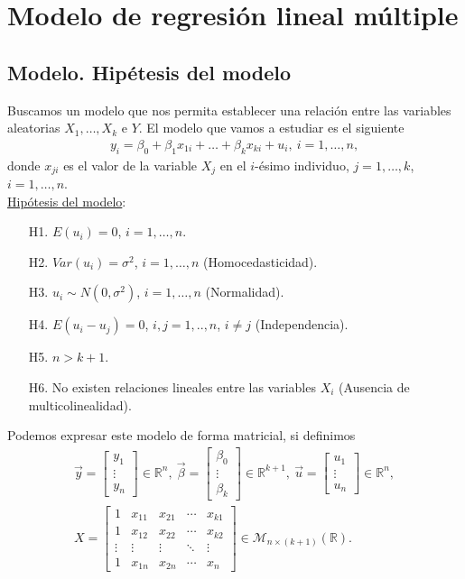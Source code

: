 \chapter{Modelo de regresión lineal múltiple}

\section{Modelo. Hipétesis del modelo}
\noindent Buscamos un modelo que nos permita establecer una relación entre las variables aleatorias $X_1,\ldots,X_k$ e $Y$. El modelo que vamos a estudiar es el siguiente
\begin{align*}
    y_i = \beta_0 + \beta_1 x_{1i} + \ldots + \beta_k x_{ki} + u_i, \ i = 1,\ldots,n,
\end{align*}
donde $x_{ji}$ es el valor de la variable $X_j$ en el $i$-ésimo individuo, $j = 1,\ldots,k$, $i=1,\ldots,n$.
\\
\newline
\underline{Hipótesis del modelo}:
\begin{enumerate}
    \item[H1.] $E(u_i) = 0$, $i = 1,\ldots,n$.
    \item[H2.] $Var(u_i) = \sigma^2$, $i = 1,\ldots,n$ (Homocedasticidad).
    \item[H3.] $u_i \sim N(0,\sigma^2)$, $i = 1,\ldots,n$ (Normalidad).
    \item[H4.] $E(u_i - u_j) = 0$, $i,j=1,..,n$, $i \not = j$ (Independencia).
    \item[H5.] $n > k+1$.
    \item[H6.] No existen relaciones lineales entre las variables $X_i$ (Ausencia de multicolinealidad).
\end{enumerate}
Podemos expresar este modelo de forma matricial, si definimos
\begin{align*}
    \vec{y} = \begin{bmatrix}
    y_1 \\
    \vdots \\
    y_n
    \end{bmatrix} \in \mathbb{R}^n, \ \vec{\beta} = \begin{bmatrix}
    \beta_0 \\
    \vdots \\
    \beta_k 
    \end{bmatrix} \in \mathbb{R}^{k+1}, \ \vec{u} = \begin{bmatrix}
    u_1 \\
    \vdots \\
    u_n 
    \end{bmatrix} \in \mathbb{R}^n, \\
    X = \begin{bmatrix}
    1 & x_{11} & x_{21} & \cdots & x_{k1} \\
    1 & x_{12} & x_{22} & \cdots & x_{k2} \\
    \vdots & \vdots & \vdots & \ddots & \vdots \\
    1 & x_{1n} & x_{2n} & \cdots & x_{n} 
    \end{bmatrix} \in \mathcal{M}_{n \times (k+1)} (\mathbb{R}).
\end{align*}
